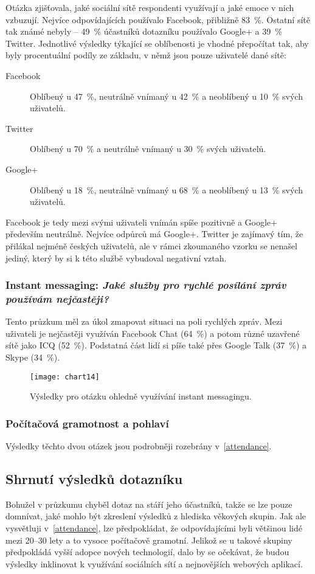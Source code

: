 \documentclass[12pt,oneside,final]{fithesis2}
\begin{document}
Otázka zjišťovala, jaké sociální sítě respondenti využívají a jaké emoce v nich vzbuzují. Nejvíce odpovídajících používalo Facebook, přibližně 83~\%. Ostatní sítě tak známé nebyly -- 49~\% účastníků dotazníku používalo Google+ a 39~\% Twitter. Jednotlivé výsledky týkající se oblíbenosti je vhodné přepočítat tak, aby byly procentuální podíly ze základu, v němž jsou pouze uživatelé dané sítě:

\begin{description}
    \item[Facebook] Oblíbený u 47~\%, neutrálně vnímaný u 42~\% a neoblíbený u 10~\% svých uživatelů.
    \item[Twitter] Oblíbený u 70~\% a neutrálně vnímaný u 30~\% svých uživatelů.
    \item[Google+] Oblíbený u 18~\%, neutrálně vnímaný u 68~\% a neoblíbený u 13~\% svých uživatelů.
\end{description}

Facebook je tedy mezi svými uživateli vnímán spíše pozitivně a Google+ především neutrálně. Nejvíce odpůrců má Google+. Twitter je zajímavý tím, že přilákal nejméně českých uživatelů, ale v rámci zkoumaného vzorku se nenašel jediný, který by si k této službě vybudoval negativní vztah.

\subsubsection*{\textbf{Instant messaging:} \emph{Jaké služby pro rychlé posílání zpráv používám nejčastěji?}}
Tento průzkum měl za úkol zmapovat situaci na poli rychlých zpráv. Mezi uživateli je nejčastěji využíván Facebook Chat (64~\%) a potom různé uzavřené sítě jako ICQ (52~\%). Podstatná část lidí si píše také přes Google Talk (37~\%) a Skype (34~\%).

\begin{figure}[h]
    \centering
    \texttt{[image: chart14]}
    \caption{Výsledky pro otázku ohledně využívání instant messagingu.}
\end{figure}

\subsubsection*{\textbf{Počítačová gramotnost a pohlaví}}
Výsledky těchto dvou otázek jsou podrobněji rozebrány v~\ref{attendance}.

\subsection{Shrnutí výsledků dotazníku}\label{pollResults}
Bohužel v průzkumu chyběl dotaz na stáří jeho účastníků, takže se lze pouze domnívat, jaké mohlo být zkreslení výsledků z hlediska věkových skupin. Jak ale vysvětluji v~\ref{attendance}, lze předpokládat, že odpovídajícími byli většinou lidé mezi 20--30 lety a to vysoce počítačově gramotní. Jelikož se u takové skupiny předpokládá vyšší adopce nových technologií, dalo by se očekávat, že budou výsledky inklinovat k využívání sociálních sítí a nejnovějších webových aplikací.
\end{document}
